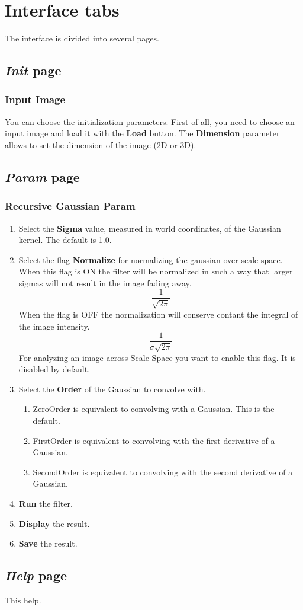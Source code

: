 \documentclass{article}
\begin{document}
\section{Interface tabs}

The interface is divided into several pages.

\subsection{\emph{Init} page}

\subsubsection{Input Image}
You can choose the initialization parameters.
First of all, you need to choose an input image and load it with the {\bf Load} button.
The {\bf Dimension} parameter allows to set the dimension of the image (2D or 3D).

\subsection{\emph{Param} page}
\subsubsection{Recursive Gaussian Param}
\begin{enumerate}
  \item Select the {\bf Sigma} value, measured in world coordinates, of the Gaussian kernel. The default is 1.0.
  \item Select the flag {\bf Normalize} for normalizing the gaussian over scale space. When this flag is ON the filter will be normalized in such a way that larger sigmas will not result in the image fading away.
		    \[\label{eq:GenRG}\frac1{\sqrt{2\pi}}\]
	When the flag is OFF the normalization will conserve contant the integral of the image intensity.
		    \[\frac1{\sigma\sqrt{2\pi}}\]
	For analyzing an image across Scale Space you want to enable this flag. It is disabled by default. 
  \item Select the {\bf Order} of the Gaussian to convolve with.
    \begin{enumerate}
      \item ZeroOrder is equivalent to convolving with a Gaussian. This is the default.
      \item FirstOrder is equivalent to convolving with the first derivative of a Gaussian.
      \item SecondOrder is equivalent to convolving with the second derivative of a Gaussian.
    \end{enumerate}
  \item {\bf Run} the filter.
  \item {\bf Display} the result.
  \item {\bf Save} the result.
\end{enumerate}




\subsection{\emph{Help} page}
This help.
\end{document}
